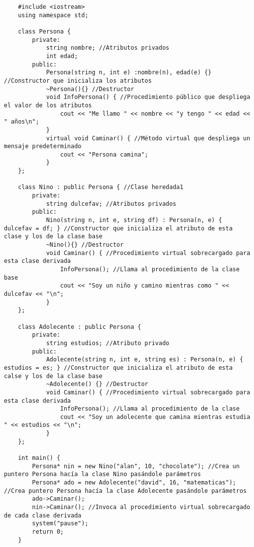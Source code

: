 \begin{lstlisting}
    #include <iostream>
    using namespace std;
    
    class Persona {
        private:
            string nombre; //Atributos privados
            int edad;
        public:
            Persona(string n, int e) :nombre(n), edad(e) {} //Constructor que inicializa los atributos
            ~Persona(){} //Destructor
            void InfoPersona() { //Procedimiento público que despliega el valor de los atributos
                cout << "Me llamo " << nombre << "y tengo " << edad << " años\n";
            }
            virtual void Caminar() { //Método virtual que despliega un mensaje predeterminado
                cout << "Persona camina";
            }
    };

    class Nino : public Persona { //Clase heredada1
        private:
            string dulcefav; //Atributos privados
        public:
            Nino(string n, int e, string df) : Persona(n, e) { dulcefav = df; } //Constructor que inicializa el atributo de esta clase y los de la clase base
            ~Nino(){} //Destructor
            void Caminar() { //Procedimiento virtual sobrecargado para esta clase derivada
                InfoPersona(); //Llama al procedimiento de la clase base
                cout << "Soy un niño y camino mientras como " << dulcefav << "\n";
            }
    };

    class Adolecente : public Persona {
        private:
            string estudios; //Atributo privado
        public:
            Adolecente(string n, int e, string es) : Persona(n, e) { estudios = es; } //Constructor que inicializa el atributo de esta calse y los de la clase base
            ~Adolecente() {} //Destructor
            void Caminar() { //Procedimiento virtual sobrecargado para esta clase derivada
                InfoPersona(); //Llama al procedimiento de la clase
                cout << "Soy un adolecente que camina mientras estudia " << estudios << "\n";
            }
    };

    int main() {
        Persona* nin = new Nino("alan", 10, "chocolate"); //Crea un puntero Persona hacía la clase Nino pasándole parámetros
        Persona* ado = new Adolecente("david", 16, "matematicas"); //Crea puntero Persona hacía la clase Adolecente pasándole parámetros
        ado->Caminar();
        nin->Caminar(); //Invoca al procedimiento virtual sobrecargado de cada clase derivada
        system("pause");
        return 0;
    }
\end{lstlisting}

